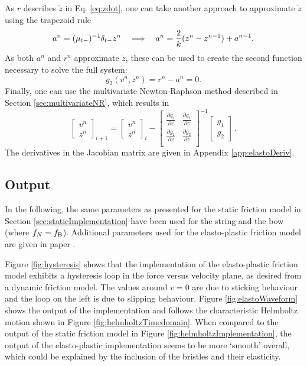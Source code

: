 As $r$ describes $\dot z$ in Eq. \eqref{eq:zdot}, one can take another approach to approximate $\dot z$ using the trapezoid rule \cite{theBible}
\begin{equation}
    a^n = (\mu_{t-})^{-1}\delta_{t-} z^n \quad \Longrightarrow\quad a^n = \frac{2}{k}(z^n - z^{n-1}) + a^{n-1}.
\end{equation}
As both $a^n$ and $r^n$ approximate $\dot z$, these can be used to create the second function necessary to solve the full system:
\begin{equation}\label{eq:elastog2}
    g_2(v^n, z^n) = r^n - a^n = 0.
\end{equation}
Finally, one can use the multivariate Newton-Raphson method described in Section \ref{sec:multivariateNR}, which results in
\begin{equation}\label{eq:NRit}
    \begin{bmatrix}
    v^n\\
    z^n
    \end{bmatrix}_{i+1}
    =
    \begin{bmatrix}
    v^n\\
    z^n
    \end{bmatrix}_i
    -
    \begin{bmatrix}
    \frac{\partial g_1}{\partial v} & \frac{\partial g_1}{\partial z}\\
    \frac{\partial g_2}{\partial v} & \frac{\partial g_2}{\partial z}\\
    \end{bmatrix}^{-1}
    \begin{bmatrix}
    g_1\\
    g_2
    \end{bmatrix}\,
    .
\end{equation}
The derivatives in the Jacobian matrix are given in Appendix \ref{app:elastoDeriv}.

\subsection{Output}
In the following, the same parameters as presented for the static friction model in Section \ref{sec:staticImplementation} have been used for the string and the bow (where $f_N = f_{\text{B}}$).
Additional parameters used for the elasto-plastic friction model are given in paper \citeP[C].

Figure \ref{fig:hysteresis} shows that the implementation of the elasto-plastic friction model exhibits a hysteresis loop in the force versus velocity plane, as desired from a dynamic friction model. The values around $v=0$ are due to sticking behaviour and the loop on the left is due to slipping behaviour.
Figure \ref{fig:elastoWaveform} shows the output of the implementation and follows the characteristic Helmholtz motion shown in Figure 
\ref{fig:helmholtzTimedomain}. When compared to the output of the static friction model in Figure \ref{fig:helmholtzImplementation}, the output of the elasto-plastic implementation seems to be more `smooth' overall, which could be explained by the inclusion of the bristles and their elasticity. 

